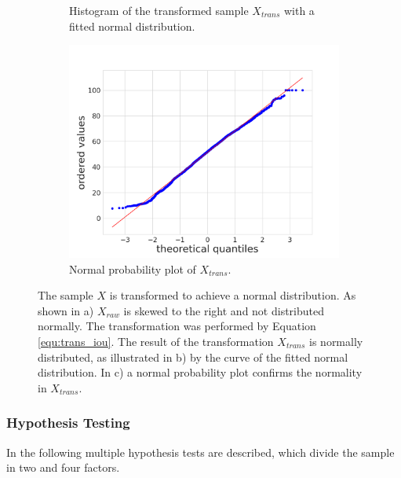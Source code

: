 \begin{figure} [h]
\begin{subfigure}[t]{0.3\textwidth}
		\caption{
			Histogram of the transformed sample $ X_{trans} $ with a fitted normal distribution.
		} \label{fig:ch5:sec1:data_transformed}
	\end{subfigure}
	\hfill
	\begin{subfigure}[t]{0.3\textwidth}
		\centering
		\includegraphics[width=\textwidth]{figures/chap51_iou_probplot.png}
		\caption{
			Normal probability plot of $ X_{trans} $.
		}\label{fig:ch5:sec1:probplot}
	\end{subfigure}
	\caption[Sample Transformation $ IoU $]{		
		The sample $ X $ is transformed to achieve a normal distribution.
		As shown in a) $ X_{raw} $ is skewed to the right and not distributed normally.
		The transformation was performed by Equation \ref{equ:trans_iou}.
		The result of the transformation $ X_{trans} $ is normally distributed, as illustrated in b) by the curve of the fitted normal distribution.
		In c) a normal probability plot confirms the normality in $ X_{trans} $.
	}\label{fig:ch5:sec1:data_transformation_iou}
\end{figure}


\subsubsection{Hypothesis Testing}

In the following multiple hypothesis tests are described, which divide the sample in two and four factors.

